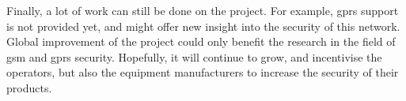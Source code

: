   Finally, a lot of work can still be done on the 
  project. For example, \gls{gprs} support is not provided yet, and
  might offer new insight into the security of this network. Global
  improvement of the project could only benefit the research in the
  field of \gls{gsm} and \gls{gprs} security. Hopefully, it will
  continue to grow, and incentivise the operators, but also the equipment
  manufacturers to increase the security of their products.
